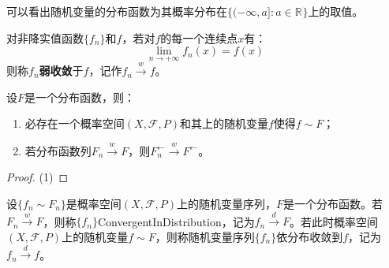 \begin{note}
	可以看出随机变量的分布函数为其概率分布在$\{(-\infty,a]:a\in\mathbb{R}^{}\}$上的取值。
\end{note}
\begin{definition}
	对非降实值函数$\{f_n\}$和$f$，若对$f$的每一个连续点$x$有：
	\begin{equation*}
		\lim_{n\to+\infty}f_n(x)=f(x)
	\end{equation*}
	则称$f_n$\textbf{弱收敛}于$f$，记作$f_n\overset{w}{\longrightarrow}f$。
\end{definition}
\begin{property}
	设$F$是一个分布函数，则：
	\begin{enumerate}
		\item 必存在一个概率空间$(X,\mathscr{F},P)$和其上的随机变量$f$使得$f\sim F$；
		\item 若分布函数列$F_n\overset{w}{\longrightarrow}F$，则$F^{\leftarrow}_n\overset{w}{\longrightarrow}F^{\leftarrow}$。
	\end{enumerate}
\end{property}
\begin{proof}
	(1)
\end{proof}
\begin{definition}
	设$\{f_n\sim F_n\}$是概率空间$(X,\mathscr{F},P)$上的随机变量序列，$F$是一个分布函数。若$F_n\overset{w}{\longrightarrow}F$，则称$\{f_n\}$\gls{ConvergentInDistribution}，记为$f_n\overset{d}{\longrightarrow}F$。若此时概率空间$(X,\mathscr{F},P)$上的随机变量$f\sim F$，则称随机变量序列$\{f_n\}$依分布收敛到$f$，记为$f_n\overset{d}{\longrightarrow}f$。
\end{definition}

